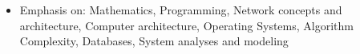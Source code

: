 \documentclass[10pt,a4paper]{altacv}
\begin{document}
\begin{itemize}
\justifying
\item Emphasis on: Mathematics, Programming, Network concepts and architecture, Computer architecture, Operating Systems, Algorithm Complexity, Databases, System analyses and modeling
\end{itemize}

\end{document}
